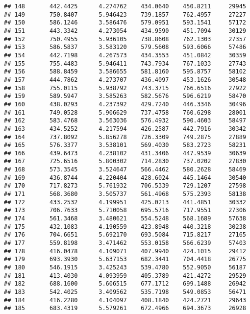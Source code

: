 \documentclass[]{article}
\begin{document}
\begin{verbatim}
## 148       442.4425      4.274762    434.0640    450.8211     29945
## 149       750.8407      5.946423    739.1857    762.4957     27227
## 150       586.1246      3.586476    579.0951    593.1541     57172
## 151       443.3342      4.273054    434.9590    451.7094     30129
## 152       750.4955      5.936105    738.8608    762.1303     27357
## 153       586.5837      3.583120    579.5608    593.6066     57486
## 154       442.7198      4.267573    434.3553    451.0842     30359
## 155       755.4483      5.946411    743.7934    767.1033     27743
## 156       588.8459      3.586655    581.8160    595.8757     58102
## 157       444.7862      4.273707    436.4097    453.1626     30548
## 158       755.0115      5.938792    743.3715    766.6516     27922
## 159       589.5947      3.585263    582.5676    596.6219     58470
## 160       438.0293      4.237392    429.7240    446.3346     30496
## 161       749.0528      5.906629    737.4758    760.6298     28001
## 162       583.4768      3.563036    576.4932    590.4603     58497
## 163       434.5252      4.217594    426.2587    442.7916     30342
## 164       737.8092      5.856278    726.3309    749.2875     27889
## 165       576.3377      3.538101    569.4030    583.2723     58231
## 166       439.6473      4.238102    431.3406    447.9539     30639
## 167       725.6516      5.800302    714.2830    737.0202     27830
## 168       573.3545      3.524647    566.4462    580.2628     58469
## 169       436.8744      4.220404    428.6024    445.1464     30540
## 170       717.8273      5.761932    706.5339    729.1207     27598
## 171       568.3680      3.505737    561.4968    575.2393     58138
## 172       433.2532      4.199951    425.0213    441.4851     30332
## 173       706.7633      5.710058    695.5716    717.9551     27306
## 174       561.3468      3.480621    554.5248    568.1689     57638
## 175       432.1083      4.190559    423.8948    440.3218     30238
## 176       704.6651      5.692170    693.5084    715.8217     27165
## 177       559.8198      3.471462    553.0158    566.6239     57403
## 178       416.0478      4.109071    407.9940    424.1015     29412
## 179       693.3930      5.637153    682.3441    704.4418     26775
## 180       546.1915      3.425243    539.4780    552.9050     56187
## 181       413.4030      4.093959    405.3789    421.4272     29529
## 182       688.1600      5.606515    677.1712    699.1488     26942
## 183       542.4025      3.409562    535.7198    549.0853     56471
## 184       416.2280      4.104097    408.1840    424.2721     29643
## 185       683.4319      5.579261    672.4966    694.3673     26928

\end{verbatim}
\end{document}
